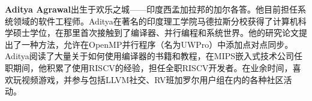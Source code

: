 
\textbf{Aditya Agrawal}出生于欢乐之城——印度西孟加拉邦的加尔各答。他目前担任系统领域的软件工程师。Aditya在著名的印度理工学院马德拉斯分校获得了计算机科学硕士学位，在那里首次接触到了编译器、并行编程和系统世界。他的研究论文提出了一种方法，允许在OpenMP并行程序（名为UWPro）中添加点对点同步。Aditya阅读了大量关于如何使用编译器的书籍和教程，在MIPS嵌入式技术公司任职期间，他积累了使用RISCV的经验，担任全职RISCV开发者。在业余时间，喜欢玩视频游戏，并参与包括LLVM社交、RV班加罗尔用户组在内的各种社区活动。
